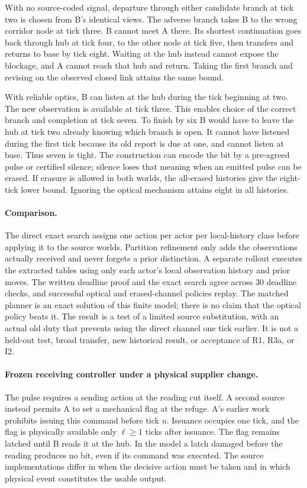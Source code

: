 \documentclass[11pt]{article}
\begin{document}
With no source-coded signal, departure through either candidate branch
at tick two is chosen from B's identical views. The adverse branch
takes B to the wrong corridor node at tick three. B cannot meet A there.
Its shortest continuation goes back through hub at tick four, to the
other node at tick five, then transfers and returns to base by tick
eight. Waiting at the hub instead cannot expose the blockage, and
A cannot reach that hub and return. Taking the first branch and
revising on the observed closed link attains the same bound.

With reliable optics, B can listen at the hub during the tick beginning
at two. The new observation is available at tick three. This enables
choice of the correct branch and completion at tick seven. To finish
by six B would have to leave the hub at tick two already knowing which
branch is open. It cannot have listened during the first tick because
its old report is due at one, and cannot listen at base. Thus seven is
tight. The construction can encode the bit by a pre-agreed pulse or
certified silence; silence loses that meaning when an emitted pulse
can be erased. If erasure is allowed in both worlds, the all-erased
histories give the eight-tick lower bound. Ignoring the optical
mechanism attains eight in all histories.

\paragraph{Comparison.}
The direct exact search assigns one action per actor per local-history
class before applying it to the source worlds. Partition refinement
only adds the observations actually received and never forgets a prior
distinction. A separate rollout executes the extracted tables using
only each actor's local observation history and prior moves.
The written deadline proof and the exact search agree across 30
deadline checks, and successful optical and erased-channel policies
replay. The matched planner is an exact solution of this finite model;
there is no claim that the optical policy beats it.
The result is a test of a limited source substitution, with an actual
old duty that prevents using the direct channel one tick earlier.
It is not a held-out test, broad transfer, new historical result, or
acceptance of R1, R3a, or I2.

\paragraph{Frozen receiving controller under a physical supplier change.}
The pulse requires a sending action at the reading cut itself.
A second source instead permits A to set a mechanical flag at the
refuge. A's earlier work prohibits issuing this command before tick
\(u\). Issuance occupies one tick, and the flag is physically
available only \(\ell\geq 1\) ticks after issuance. The flag remains
latched until B reads it at the hub. In the model a latch damaged
before the reading produces no bit, even if its command was executed.
The source implementations differ in when the decisive action must
be taken and in which physical event constitutes the usable output.
\end{document}
